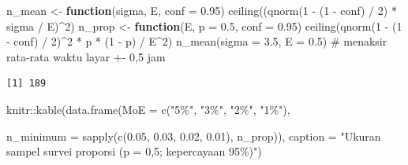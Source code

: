 \documentclass[
  indonesian,
  letterpaper,
]{book}
\newenvironment{Shaded}{\begin{snugshade}}{\end{snugshade}}
\newcommand{\AttributeTok}[1]{\textcolor[rgb]{0.40,0.45,0.13}{#1}}
\newcommand{\CommentTok}[1]{\textcolor[rgb]{0.37,0.37,0.37}{#1}}
\newcommand{\ControlFlowTok}[1]{\textcolor[rgb]{0.00,0.23,0.31}{\textbf{#1}}}
\newcommand{\DecValTok}[1]{\textcolor[rgb]{0.68,0.00,0.00}{#1}}
\newcommand{\FloatTok}[1]{\textcolor[rgb]{0.68,0.00,0.00}{#1}}
\newcommand{\FunctionTok}[1]{\textcolor[rgb]{0.28,0.35,0.67}{#1}}
\newcommand{\NormalTok}[1]{\textcolor[rgb]{0.00,0.23,0.31}{#1}}
\newcommand{\OtherTok}[1]{\textcolor[rgb]{0.00,0.23,0.31}{#1}}
\newcommand{\SpecialCharTok}[1]{\textcolor[rgb]{0.37,0.37,0.37}{#1}}
\newcommand{\StringTok}[1]{\textcolor[rgb]{0.13,0.47,0.30}{#1}}
\begin{document}
\begin{Shaded}
\begin{Highlighting}[]
\NormalTok{n\_mean }\OtherTok{\textless{}{-}} \ControlFlowTok{function}\NormalTok{(sigma, E, }\AttributeTok{conf =} \FloatTok{0.95}\NormalTok{) }\FunctionTok{ceiling}\NormalTok{((}\FunctionTok{qnorm}\NormalTok{(}\DecValTok{1} \SpecialCharTok{{-}}\NormalTok{ (}\DecValTok{1} \SpecialCharTok{{-}}\NormalTok{ conf) }\SpecialCharTok{/} \DecValTok{2}\NormalTok{) }\SpecialCharTok{*}
\NormalTok{ sigma }\SpecialCharTok{/}\NormalTok{ E)}\SpecialCharTok{\^{}}\DecValTok{2}\NormalTok{)}
\NormalTok{n\_prop }\OtherTok{\textless{}{-}} \ControlFlowTok{function}\NormalTok{(E, }\AttributeTok{p =} \FloatTok{0.5}\NormalTok{, }\AttributeTok{conf =} \FloatTok{0.95}\NormalTok{) }\FunctionTok{ceiling}\NormalTok{(}\FunctionTok{qnorm}\NormalTok{(}\DecValTok{1} \SpecialCharTok{{-}}\NormalTok{ (}\DecValTok{1} \SpecialCharTok{{-}}\NormalTok{ conf) }\SpecialCharTok{/} \DecValTok{2}\NormalTok{)}\SpecialCharTok{\^{}}\DecValTok{2} \SpecialCharTok{*}
\NormalTok{p }\SpecialCharTok{*}\NormalTok{ (}\DecValTok{1} \SpecialCharTok{{-}}\NormalTok{ p) }\SpecialCharTok{/}\NormalTok{ E}\SpecialCharTok{\^{}}\DecValTok{2}\NormalTok{)}
\FunctionTok{n\_mean}\NormalTok{(}\AttributeTok{sigma =} \FloatTok{3.5}\NormalTok{, }\AttributeTok{E =} \FloatTok{0.5}\NormalTok{) }\CommentTok{\# menaksir rata{-}rata waktu layar +{-} 0,5 jam}
\end{Highlighting}
\end{Shaded}

\begin{verbatim}
[1] 189
\end{verbatim}

\begin{Shaded}
\begin{Highlighting}[]
\NormalTok{knitr}\SpecialCharTok{::}\FunctionTok{kable}\NormalTok{(}\FunctionTok{data.frame}\NormalTok{(}\AttributeTok{MoE =} \FunctionTok{c}\NormalTok{(}\StringTok{"5\%"}\NormalTok{, }\StringTok{"3\%"}\NormalTok{, }\StringTok{"2\%"}\NormalTok{, }\StringTok{"1\%"}\NormalTok{),}

\AttributeTok{n\_minimum =} \FunctionTok{sapply}\NormalTok{(}\FunctionTok{c}\NormalTok{(}\FloatTok{0.05}\NormalTok{, }\FloatTok{0.03}\NormalTok{, }\FloatTok{0.02}\NormalTok{, }\FloatTok{0.01}\NormalTok{), n\_prop)),}
\AttributeTok{caption =} \StringTok{"Ukuran sampel survei proporsi (p = 0,5; kepercayaan 95\%)"}\NormalTok{)}
\end{Highlighting}
\end{Shaded}
\end{document}
